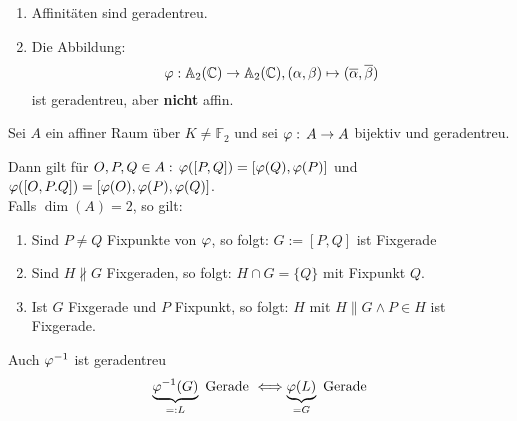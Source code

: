 \documentclass[parskip,a4paper,twoside,DIV15,BCOR12mm]{scrbook}
\begin{document}
\begin{example}
\begin{enumerate}
\item Affinitäten sind geradentreu.
\item Die Abbildung:
\[\varphi:\mathbb{A}_2(\mathbb{C})\to\mathbb{A}_2(\mathbb{C}), (\alpha,\beta)\mapsto
(\overline\alpha,\overline\beta)\]
ist geradentreu, aber \textbf{nicht} affin.
\end{enumerate}
\end{example}
\begin{lemma}
Sei \(A\) ein affiner Raum über \(K\neq\mathbb{F}_{2}\) und sei 
\(\varphi:\,A\to A\) bijektiv und geradentreu.

Dann gilt für \(O,P,Q\in A:\,\varphi([P,Q])=[\varphi(Q),\varphi(P)]\) und
\(\varphi([O,P.Q])=[\varphi(O),\varphi(P),\varphi(Q)]\).\\
Falls \(\dim(A)=2\), so gilt:
\begin{enumerate}
\item Sind \(P\neq Q\) Fixpunkte von \(\varphi\), so folgt: \(G:=[P,Q]\) ist 
 Fixgerade
\item Sind \(H\not\parallel G\) Fixgeraden, so folgt: \(H\cap G=\{Q\}\) mit
 Fixpunkt \(Q\).
\item Ist \(G\) Fixgerade und \(P\) Fixpunkt, so folgt: \(H\) mit 
\(H\parallel G\wedge P\in H\) ist Fixgerade.
\end{enumerate}
\end{lemma}
\begin{prerem}
Auch \(\varphi^{-1}\) ist geradentreu
\[
\underbrace{\varphi^{-1}(G)}_{=:L}\text{ Gerade }\Longleftrightarrow
    \underbrace{\varphi(L)}_{=G}\text{ Gerade}
\]
\end{prerem}
\end{document}
